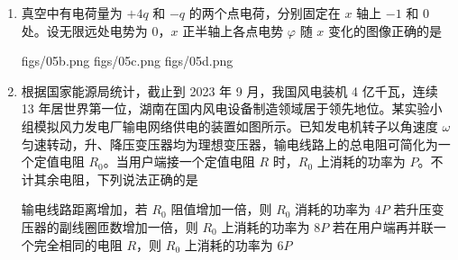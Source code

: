 \documentclass[\gkver]{gaokaozhenti}
\begin{document}
\begin{enumerate}
{

同时有 $l_{Ob} = l_{Oc} = \sqrt{5} R$

可得 $0 < U_{Oa} < U_{Ob} = U_{Oc}$

得 $\varphi_{O} > \varphi_{a} > \varphi_{b} = \varphi_{c}$

故选 C。
}

\item
真空中有电荷量为 $+4q$ 和 $-q$ 的两个点电荷，分别固定在 $x$ 轴上 $-1$ 和 $0$ 处。设无限远处电势为 0，$x$ 正半轴上各点电势 $\varphi$ 随 $x$ 变化的图像正确的是

{figs/05b.png}
{figs/05c.png}
{figs/05d.png}


\item
根据国家能源局统计，截止到 2023 年 9 月，我国风电装机 4 亿千瓦，连续 13 年居世界第一位，湖南在国内风电设备制造领域居于领先地位。某实验小组模拟风力发电厂输电网络供电的装置如图所示。已知发电机转子以角速度 $\omega$ 匀速转动，升、降压变压器均为理想变压器，输电线路上的总电阻可简化为一个定值电阻 $R_{0}$。当用户端接一个定值电阻 $R$ 时，$R_{0}$ 上消耗的功率为 $P$。不计其余电阻，下列说法正确的是


{输电线路距离增加，若 $R_{0}$ 阻值增加一倍，则 $R_{0}$ 消耗的功率为 $4P$}
{若升压变压器的副线圈匝数增加一倍，则 $R_{0}$ 上消耗的功率为 $8P$}
{若在用户端再并联一个完全相同的电阻 $R$，则 $R_{0}$ 上消耗的功率为 $6P$}

\end{enumerate}
\end{document}
